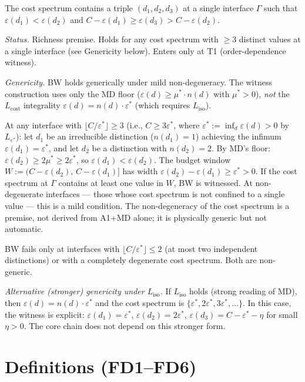\documentclass[11pt,a4paper]{article}
\theoremstyle{definition}
\newcommand{\eps}{\varepsilon}
\begin{document}
\begin{tcolorbox}[apfbox, title={BW: Budget-Window Richness (Richness Premise)}]
The cost spectrum contains a triple $(d_1, d_2, d_3)$ at a single interface $\Gamma$ such that $\eps(d_1) < \eps(d_2)$ and $C - \eps(d_1) \ge \eps(d_3) > C - \eps(d_2)$.

\smallskip
\noindent\textit{Status.}  Richness premise.  Holds for any cost spectrum with $\ge 3$ distinct values at a single interface (see Genericity below).  Enters only at T1 (order-dependence witness).

\smallskip
\noindent\textit{Genericity.}  BW holds generically under mild non-degeneracy.  The witness construction uses only the MD floor ($\eps(d) \ge \mu^* \cdot n(d)$ with $\mu^* > 0$), \emph{not} the $L_{\mathrm{cost}}$ integrality $\eps(d) = n(d) \cdot \eps^*$ (which requires $L_{\mathrm{iso}}$).

At any interface with $\lfloor C/\eps^*\rfloor \ge 3$ (i.e., $C \ge 3\eps^*$, where $\eps^* := \inf_d \eps(d) > 0$ by $L_{\eps^*}$): let $d_1$ be an irreducible distinction ($n(d_1) = 1$) achieving the infimum $\eps(d_1) = \eps^*$, and let $d_2$ be a distinction with $n(d_2) = 2$.  By MD's floor: $\eps(d_2) \ge 2\mu^* \ge 2\eps^*$, so $\eps(d_1) < \eps(d_2)$.  The budget window $W := (C - \eps(d_2),\, C - \eps(d_1)]$ has width $\eps(d_2) - \eps(d_1) \ge \eps^* > 0$.  If the cost spectrum at $\Gamma$ contains at least one value in $W$, BW is witnessed.  At non-degenerate interfaces --- those whose cost spectrum is not confined to a single value --- this is a mild condition.  The non-degeneracy of the cost spectrum is a premise, not derived from A1+MD alone; it is physically generic but not automatic.

BW fails only at interfaces with $\lfloor C/\eps^*\rfloor \le 2$ (at most two independent distinctions) or with a completely degenerate cost spectrum.  Both are non-generic.

\smallskip\noindent\textit{Alternative (stronger) genericity under $L_{\mathrm{iso}}$.}  If $L_{\mathrm{iso}}$ holds (strong reading of MD), then $\eps(d) = n(d) \cdot \eps^*$ and the cost spectrum is $\{\eps^*, 2\eps^*, 3\eps^*, \ldots\}$.  In this case, the witness is explicit: $\eps(d_1) = \eps^*$, $\eps(d_2) = 2\eps^*$, $\eps(d_3) = C - \eps^* - \eta$ for small $\eta > 0$.  The core chain does not depend on this stronger form.
\end{tcolorbox}

\section{Definitions (FD1--FD6)}
\label{sec:defs}
\end{document}
